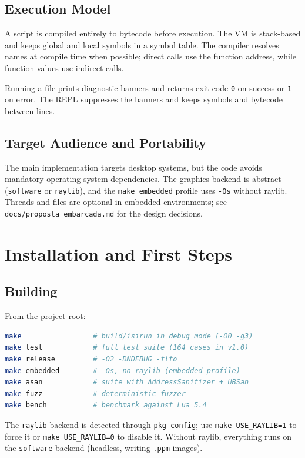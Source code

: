 \documentclass[11pt,a4paper,oneside]{report}
\newcommand{\code}[1]{\texttt{#1}}
\newcommand{\file}[1]{\texttt{#1}}
\begin{document}
\section{Execution Model}
A script is compiled entirely to bytecode before execution. The VM is
stack-based and keeps global and local symbols in a symbol table. The
compiler resolves names at compile time when possible; direct calls use
the function address, while function values use indirect calls.

Running a file prints diagnostic banners and returns exit code \code{0}
on success or \code{1} on error. The REPL suppresses the banners and
keeps symbols and bytecode between lines.

\section{Target Audience and Portability}
The main implementation targets desktop systems, but the code avoids
mandatory operating-system dependencies. The graphics backend is
abstract (\code{software} or \code{raylib}), and the \code{make embedded}
profile uses \code{-Os} without raylib. Threads and files are optional
in embedded environments; see \file{docs/proposta\_embarcada.md} for the
design decisions.

\chapter{Installation and First Steps}
\label{cap:inicio}

\section{Building}
From the project root:

\begin{lstlisting}[language=bash]
make                 # build/isirun in debug mode (-O0 -g3)
make test            # full test suite (164 cases in v1.0)
make release         # -O2 -DNDEBUG -flto
make embedded        # -Os, no raylib (embedded profile)
make asan            # suite with AddressSanitizer + UBSan
make fuzz            # deterministic fuzzer
make bench           # benchmark against Lua 5.4
\end{lstlisting}

The \code{raylib} backend is detected through \code{pkg-config}; use
\code{make USE\_RAYLIB=1} to force it or \code{make USE\_RAYLIB=0} to
disable it. Without raylib, everything runs on the \code{software}
backend (headless, writing \code{.ppm} images).
\end{document}
